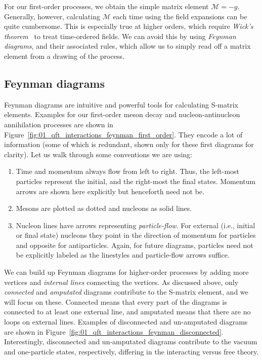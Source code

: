 For our first-order processes, we obtain the simple matrix element $\mathcal M = -g$.
Generally, however, calculating $\mathcal M$ each time using the field expansions can be quite cumbersome.
This is especially true at higher orders, which require \textit{Wick's theorem}~\cite{Wick:1950ee} to treat time-ordered fields.
We can avoid this by using \textit{Feynman diagrams}, and their associated rules, which allow us to simply read off a matrix element from a drawing of the process.



\subsection{Feynman diagrams}
\label{sec:01_qft_interactions_feynman}

Feynman diagrams are intuitive and powerful tools for calculating S-matrix elements.
Examples for our first-order meson decay and nucleon-antinucleon annihilation processes are shown in Figure~\ref{fig:01_qft_interactions_feynman_first_order}.
They encode a lot of information (some of which is redundant, shown only for these first diagrams for clarity).
Let us walk through some conventions we are using:
\begin{enumerate}
	\item Time and momentum always flow from left to right.
	Thus, the left-most particles represent the initial, and the right-most the final states.
	Momentum arrows are shown here explicitly but henceforth need not be.
	\item Mesons are plotted as dotted and nucleons as solid lines.
	\item Nucleon lines have arrows representing \textit{particle-flow}.
	For external (i.e., initial or final state) nucleons they point in the direction of momentum for particles and opposite for antiparticles.
	Again, for future diagrams, particles need not be explicitly labeled as the linestyles and particle-flow arrows suffice.
\end{enumerate}



We can build up Feynman diagrams for higher-order processes by adding more vertices and \textit{internal lines} connecting the vertices.
As discussed above, only \textit{connected} and \textit{amputated} diagrams contribute to the S-matrix element, and we will focus on these.
Connected means that every part of the diagrams is connected to at least one external line, and amputated means that there are no loops on external lines.
Examples of disconnected and un-amputated diagrams are shown in Figure~\ref{fig:01_qft_interactions_feynman_disconnected}.
Interestingly, disconnected and un-amputated diagrams contribute to the vacuum and one-particle states, respectively, differing in the interacting versus free theory.

